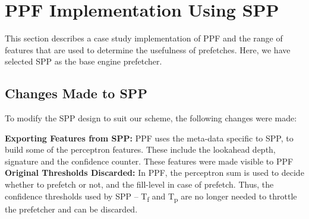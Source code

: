 \section{PPF Implementation Using SPP}
\label{Impl}

This section describes a case study implementation of PPF and the
range of features that are used to determine the usefulness of
prefetches.  Here, we have selected SPP as the base engine prefetcher.

\subsection{Changes Made to SPP}
\label{Impl-Changes}
To modify the SPP design to suit our scheme, the following changes
were made:

\noindent \textbf{Exporting Features from SPP:} PPF uses the meta-data 
specific to SPP, to build some of the perceptron features. These include
the lookahead depth, signature and the confidence counter. These features 
were made visible to PPF\\
%
\noindent \textbf{Original Thresholds Discarded:} In PPF, the
perceptron sum is used to decide whether to prefetch or not, and the
fill-level in case of prefetch.  Thus, the confidence thresholds used 
by SPP -- T\textsubscript{f} and T\textsubscript{p} are no longer needed to
throttle the prefetcher and can be discarded.
%
%
%
%
%

